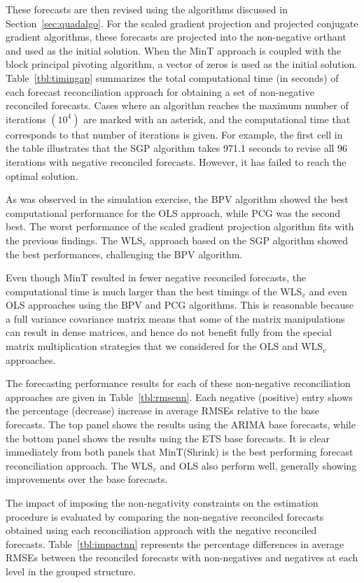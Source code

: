 \documentclass[twocolumn]{svjour3}
\begin{document}
These forecasts are then revised using the algorithms discussed in Section~\ref{sec:quadalgo}. For the scaled gradient projection and projected conjugate gradient algorithms, these forecasts are projected into the non-negative orthant and used as the initial solution. When the MinT approach is coupled with the block principal pivoting algorithm, a vector of zeros is used as the initial solution. Table~\ref{tbl:timingap} summarizes the total computational time (in seconds) of each forecast reconciliation approach for obtaining a set of non-negative reconciled forecasts. Cases where an algorithm reaches the maximum number of iterations $(10^{4})$ are marked with an asterisk, and the computational time that corresponds to that number of iterations is given. For example, the first cell in the table illustrates that the SGP algorithm takes 971.1 seconds to revise all 96 iterations with negative reconciled forecasts. However, it has failed to reach the optimal solution.

As was observed in the simulation exercise, the BPV algorithm showed the best computational performance for the OLS approach, while PCG was the second best. The worst performance of the scaled gradient projection algorithm fits with the previous findings. The WLS$_{v}$ approach based on the SGP algorithm showed the best performances, challenging the BPV algorithm.

Even though MinT resulted in fewer negative reconciled forecasts, the computational time is much larger than the best timings of the WLS$_{v}$ and even OLS approaches using the BPV and PCG algorithms. This is reasonable because a full variance covariance matrix means that some of the matrix manipulations can result in dense matrices, and hence do not benefit fully from the special matrix multiplication strategies that we considered for the OLS and WLS$_{v}$ approaches.

{\color{red} 
  The forecasting performance results for each of these non-negative reconciliation approaches are given in Table~\ref{tbl:rmsenn}. Each negative (positive) entry shows the percentage (decrease) increase in average RMSEs relative to the base forecasts. The top panel shows the results using the ARIMA base forecasts, while the bottom panel shows the results using the ETS base forecasts. It is clear immediately from both panels that MinT(Shrink) is the best performing forecast reconciliation approach. The WLS$_v$ and OLS also perform well, generally showing improvements over the base forecasts.}


The impact of imposing the non-negativity constraints on the estimation procedure is evaluated by comparing the non-negative reconciled forecasts obtained using each reconciliation approach with the negative reconciled forecasts. Table~\ref{tbl:impactnn} represents the percentage differences in average RMSEs between the reconciled forecasts with non-negatives and negatives at each level in the grouped structure.
\end{document}
